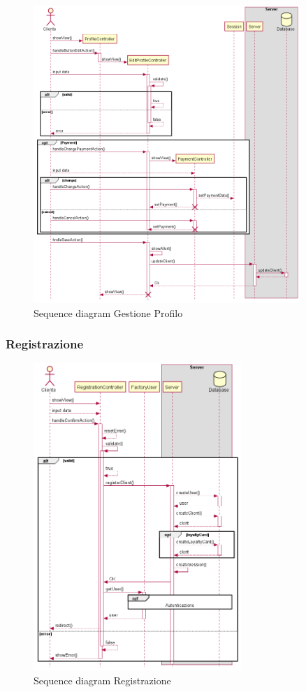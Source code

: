 \documentclass[12pt, a4paper]{report}
\begin{document}
\begin{figure}[h]
  \centering
  \includegraphics[width=0.9\textwidth]{profile_sequence.png}
  \caption{Sequence diagram Gestione Profilo}
\end{figure}

\newpage

\subsubsection{Registrazione}

\begin{figure}[h]
  \centering
  \includegraphics[width=0.7\textwidth]{registration_sequence.png}
  \caption{Sequence diagram Registrazione}
\end{figure}
\end{document}
